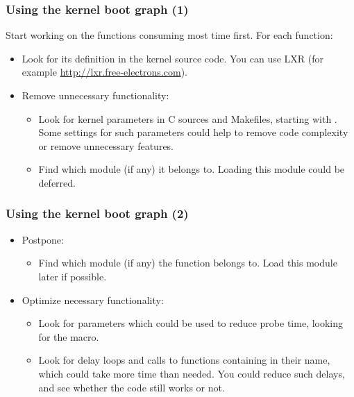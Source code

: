 \begin{frame}
\frametitle{Using the kernel boot graph (1)}
Start working on the functions consuming most time first. For each
function:
\begin{itemize}
\item Look for its definition in the kernel source code. You can use LXR
      (for example \url{http://lxr.free-electrons.com}).
\item Remove unnecessary functionality:
      \begin{itemize}
      \item Look for kernel parameters in C sources and Makefiles, starting
      with . Some settings for such parameters could help
      to remove code complexity or remove unnecessary features. 
      \item Find which module (if any) it belongs to. Loading this module
            could be deferred.
      \end{itemize}
\end{itemize}
\end{frame}

\begin{frame}
\frametitle{Using the kernel boot graph (2)}
\begin{itemize}
\item Postpone:
      \begin{itemize}
      \item Find which module (if any) the function belongs to.
            Load this module later if possible.
      \end{itemize}
\item Optimize necessary functionality:
      \begin{itemize}
      \item Look for parameters which could be used to reduce probe time,
            looking for the  macro.
      \item Look for delay loops and calls to functions containing
             in their name, which could take more time than
            needed. You could reduce such delays, and see whether the 
            code still works or not.
      \end{itemize}
\end{itemize}
\end{frame}

